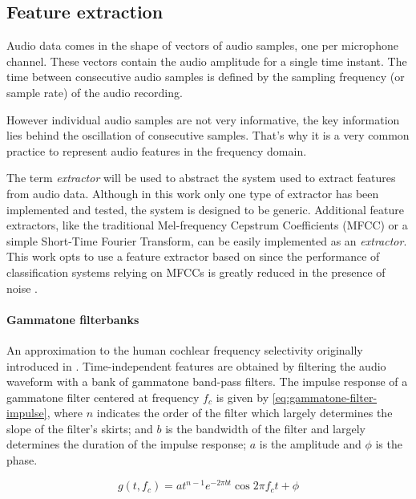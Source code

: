 \subsection{Feature extraction} \label{subsec:feature-extraction}

Audio data comes in the shape of vectors of audio samples, one per microphone
channel. These vectors contain the audio amplitude for a single time instant.
The time between consecutive audio samples is defined by the sampling frequency
(or sample rate) of the audio recording.

However individual audio samples are not very informative, the key information
lies behind the oscillation of consecutive samples. That's why it is a very
common practice to represent audio features in the frequency domain.

The term \emph{extractor} will be used to abstract the system used to extract
features from audio data. Although in this work only one type of extractor has
been implemented and tested, the system is designed to be generic. Additional
feature extractors, like the traditional Mel-frequency Cepstrum Coefficients
(MFCC) or a simple Short-Time Fourier Transform, can be easily implemented as
an \emph{extractor}. This work opts to use a feature extractor based on
 since the performance of
classification systems relying on MFCCs is greatly reduced in the presence of
noise \cite{marchegiani2018a}.

\paragraph{Gammatone filterbanks} \label{para:gammatone-filterbank}

An approximation to the human cochlear frequency selectivity originally
introduced in \cite{GTF1998}. Time-independent features are obtained by
filtering the audio waveform with a bank of gammatone band-pass filters. The
impulse response of a gammatone filter centered at frequency $f_c$ is given by
\cref{eq:gammatone-filter-impulse}, where $n$ indicates the order of the filter
which largely determines the slope of the filter's skirts; and $b$ is the
bandwidth of the filter and largely determines the duration of the impulse
response; $a$ is the amplitude and $\phi$ is the phase.

\begin{equation}
    g(t, f_c) = a t^{n-1}e^{-2 \pi b t} \cos{2 \pi f_c t + \phi}
    \label{eq:gammatone-filter-impulse}
\end{equation}

